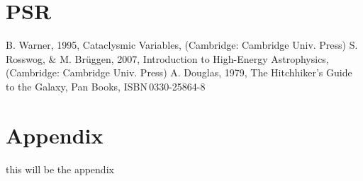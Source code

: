 \documentclass[oneside,a4paper,11pt]{report}
\begin{document}
\section{PSR}







\begin{thebibliography}{99}
 B. Warner, 1995, Cataclysmic Variables, (Cambridge: Cambridge Univ. Press)
 S. Rosswog, \& M. Br\"{u}ggen, 2007, Introduction to High-Energy Astrophysics,
(Cambridge: Cambridge Univ. Press)
 A. Douglas, 1979, The Hitchhiker's Guide to the Galaxy, Pan Books,
ISBN\,0330-25864-8 
\end{thebibliography}
\clearpage

\appendix
\section*{Appendix}
this will be the appendix
\end{document}

